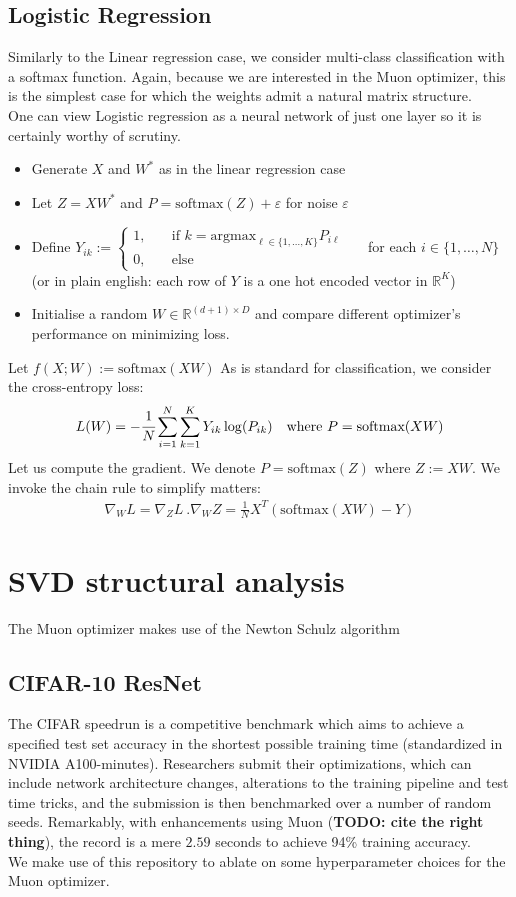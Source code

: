 \documentclass[12pt]{book}
\newcommand{\R}{\mathbb{R}}
\newcommand{\todo}[1]{{\color{red}\bf{TODO: #1}}}
\begin{document}
\subsection{Logistic Regression}
Similarly to the Linear regression case, we consider multi-class classification with a softmax function. Again, because we are interested in the Muon optimizer, this is the simplest case for which the weights admit a natural matrix structure. 
\\
One can view Logistic regression as a neural network of just one layer so it is certainly worthy of scrutiny.  
\begin{itemize}
\item Generate $X$ and  $W^*$ as in the linear regression case
\item  Let $Z = XW^*$ and  $P = \text{softmax}(Z) + \varepsilon $ for noise $\varepsilon $
\item  Define $Y_{ik} := \begin{cases}
		1, \quad &\text{if $k = \text{argmax}_{\ell \in \{1,\ldots,K\} } P_{i\ell} $}\\
		0, &\text{else}
\end{cases}$\ \ \  for each $i \in\{1,\ldots,N\} $ (or in plain english: each row of $Y$ is a one hot encoded vector in $\R^{K}$)
\item Initialise a random $W\in \R^{(d+1) \times D}$ and compare different optimizer's performance on minimizing loss. 
\end{itemize}
Let $f(X ; W) := \text{softmax}(XW)$
As is standard for classification, we consider the cross-entropy loss:
\[
L(W) = - \cfrac{1}{N} \sum_{i = 1}^{N} \sum_{k=1}^{K} {Y_{ik} \log(P_{ik})} \quad \text{where } P = \text{softmax}(XW)
\]
Let us compute the gradient. We denote $P = \text{softmax}(Z)$  where $Z := XW$. We invoke the chain rule to simplify matters: 
\begin{align*}
\nabla_W L = \nabla_Z L\  . \nabla_W Z = \frac{1}{N} X^{T} (\text{softmax}(XW) - Y)
\end{align*}
\section{SVD structural analysis}
The Muon optimizer makes use of the Newton Schulz algorithm 
\subsection{CIFAR-10 ResNet}
The CIFAR speedrun is a competitive benchmark which aims to achieve a specified test set accuracy in the shortest possible training time (standardized in NVIDIA A100-minutes). Researchers submit their optimizations, which can include network architecture changes, alterations to the training pipeline and test time tricks, and the submission is then benchmarked over a number of random seeds. 
Remarkably, with enhancements using Muon (\todo{cite the right thing}), the record is a mere $2.59$ seconds to achieve 94\% training accuracy. 
\\
We make use of this repository to ablate on some hyperparameter choices for the Muon optimizer. 
\end{document}
